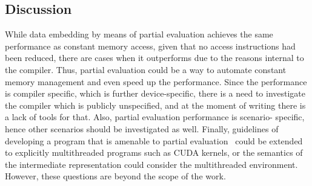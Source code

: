 \subsection{Discussion}

While data embedding by means of partial evaluation achieves the same performance as constant memory access, given that no access instructions had been reduced, there are cases when it outperforms due to the reasons internal to the compiler.
Thus, partial evaluation could be a way to automate constant memory management and even speed up the performance.
Since the performance is compiler specific, which is further device-specific, there is a need to investigate the compiler which is publicly unspecified, and at the moment of writing there is a lack of tools for that.
Also, partial evaluation performance is scenario- specific, hence other scenarios should be investigated as well.
Finally, guidelines of developing a program that is amenable to partial evaluation~\cite{Jones1993} could be extended to explicitly multithreaded programs such as CUDA kernels, or the semantics of the intermediate representation could consider the multithreaded environment.
However, these questions are beyond the scope of the work.



